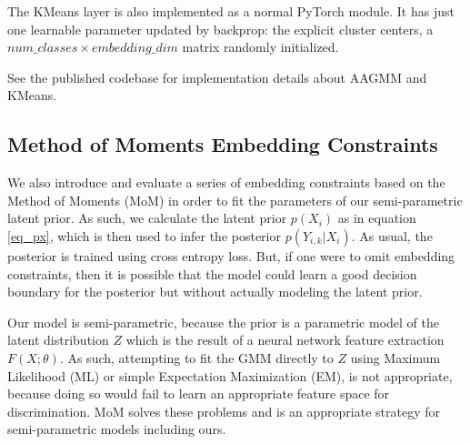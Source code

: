 \documentclass[10pt,twocolumn,letterpaper]{article}
\begin{document}

The KMeans layer is also implemented as a normal PyTorch \cite{pytorch} module.
It has just one learnable parameter updated by backprop: the explicit cluster centers, a $num\_classes \times embedding\_dim$ matrix randomly initialized.

See the published codebase for implementation details about AAGMM and KMeans.




\subsection{Method of Moments Embedding Constraints}

We also introduce and evaluate a series of embedding constraints based on the Method of Moments (MoM) \cite{pearson1936method} in order to fit the parameters of our semi-parametric latent prior.  
As such, we calculate the latent prior $p(X_i)$ as in equation \ref{eq_px}, which is then used to infer the posterior $p(Y_{i,k}|X_i)$.  As usual, the posterior is trained using cross entropy loss.  
But, if one were to omit embedding constraints, then it is possible that the model could learn a good decision boundary for the posterior but without actually modeling the latent prior.

Our model is semi-parametric, because the prior is a parametric model of the latent distribution $Z$ which is the result of a neural network feature extraction $F(X;\theta)$. 
As such, attempting to fit the GMM directly to $Z$ using Maximum Likelihood (ML) or simple Expectation Maximization (EM), is not appropriate, because doing so would fail to learn an appropriate feature space for discrimination.
MoM solves these problems and is an appropriate strategy for semi-parametric models including ours.
\end{document}
